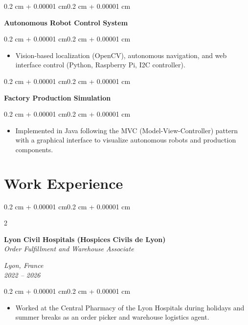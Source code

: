 \documentclass[10pt, a4paper]{article}
\newenvironment{highlights}{
    \begin{itemize}[
        topsep=0.10 cm,
        parsep=0.10 cm,
        partopsep=0pt,
        itemsep=0pt,
        leftmargin=0.4 cm + 10pt
    ]
}{
    \end{itemize}
}
\newenvironment{onecolentry}{
    \begin{adjustwidth}{0.2 cm + 0.00001 cm}{0.2 cm + 0.00001 cm}
}{
    \end{adjustwidth}
}
\newenvironment{twocolentry}[2][]{
    \onecolentry
    \def\secondColumn{#2}
    \setcolumnwidth{\fill, 4.5 cm}
    \begin{paracol}{2}
}{
    \switchcolumn \raggedleft \secondColumn
    \end{paracol}
    \endonecolentry
}
\begin{document}
        \begin{onecolentry}
            \textbf{Autonomous Robot Control System}
        \end{onecolentry}
        \vspace{0.05 cm}
        \begin{onecolentry}
            \begin{highlights}
                \item Vision-based localization (OpenCV), autonomous navigation,
                    and web interface control (Python, Raspberry Pi, I2C
                    controller).
            \end{highlights}
        \end{onecolentry}
        \vspace{0.2 cm}

        \begin{onecolentry}
            \textbf{Factory Production Simulation}
        \end{onecolentry}
        \vspace{0.05 cm}
        \begin{onecolentry}
            \begin{highlights}
                \item Implemented in Java following the MVC
                    (Model-View-Controller) pattern with a graphical interface
                    to visualize autonomous robots and production components.
            \end{highlights}
        \end{onecolentry}

    \section{Work Experience}

        \begin{twocolentry}{
        \textit{Lyon, France} \\
        \textit{2022 – 2026}}
            \textbf{Lyon Civil Hospitals (Hospices Civils de Lyon)} \\
            \textit{Order Fulfillment and Warehouse Associate}
        \end{twocolentry}

        \vspace{0.10 cm}
        \begin{onecolentry}
            \begin{highlights}
                \item Worked at the Central Pharmacy of the Lyon Hospitals
                    during holidays and summer breaks as an order picker and
                    warehouse logistics agent.
            \end{highlights}
        \end{onecolentry}
\end{document}
